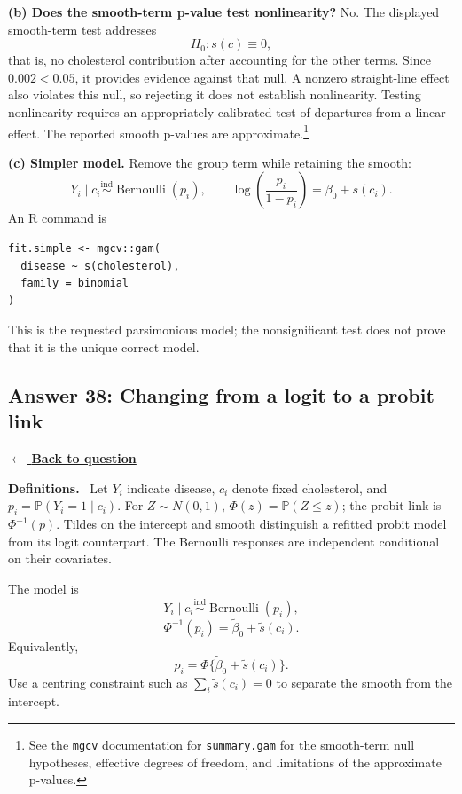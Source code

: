 \documentclass[11pt,a4paper]{article}
\newcommand{\given}{\mathrel{|}}
\newcommand{\answernav}[1]{%
  \label{answer:#1}%
  \noindent\hyperref[question:#1]{$\leftarrow$ \textbf{Back to question}}%
  \par\smallskip}
\newcommand{\studyheading}[1]{%
  \par\medskip\noindent\textcolor{statblue}{\textbf{#1.}}\ }
\begin{document}
\textbf{(b) Does the smooth-term p-value test nonlinearity?}
No. The displayed smooth-term test addresses
\[
\boxed{H_0:s(c)\equiv0,}
\]
that is, no cholesterol contribution after accounting for the other
terms. Since $0.002<0.05$, it provides evidence against that null.
A nonzero straight-line effect also violates this null, so rejecting it
does not establish nonlinearity. Testing nonlinearity requires an
appropriately calibrated test of departures from a linear effect.
The reported smooth p-values are approximate.\footnote{See the
\href{https://stat.ethz.ch/R-manual/R-devel/library/mgcv/html/summary.gam.html}
{\texttt{mgcv} documentation for \texttt{summary.gam}} for the smooth-term
null hypotheses, effective degrees of freedom, and limitations of the
approximate p-values.}

\textbf{(c) Simpler model.}
Remove the group term while retaining the smooth:
\[
Y_i\given c_i\overset{\mathrm{ind}}{\sim}\operatorname{Bernoulli}(p_i),
\qquad
\log\left(\frac{p_i}{1-p_i}\right)=\beta_0+s(c_i).
\]
An R command is
\begin{samepage}
\begin{verbatim}
fit.simple <- mgcv::gam(
  disease ~ s(cholesterol),
  family = binomial
)
\end{verbatim}
\end{samepage}
This is the requested parsimonious model; the nonsignificant test does not
prove that it is the unique correct model.

\clearpage

\subsection{Answer 38: Changing from a logit to a probit link}
\answernav{38}

\studyheading{Definitions}
Let $Y_i$ indicate disease, $c_i$ denote fixed cholesterol, and $p_i=\mathbb P(Y_i=1\given c_i)$.
For $Z\sim N(0,1)$, $\Phi(z)=\mathbb P(Z\le z)$; the probit link is $\Phi^{-1}(p)$.
Tildes on the intercept and smooth distinguish a refitted probit model from its logit counterpart.
The Bernoulli responses are independent conditional on their covariates.

The model is
\[
Y_i\given c_i\overset{\mathrm{ind}}{\sim}\operatorname{Bernoulli}(p_i),
\]
\[
\boxed{\Phi^{-1}(p_i)=\widetilde\beta_0+\widetilde s(c_i).}
\]
Equivalently,
\[
\boxed{p_i=\Phi\{\widetilde\beta_0+\widetilde s(c_i)\}.}
\]
Use a centring constraint such as $\sum_i\widetilde s(c_i)=0$ to separate the smooth from the intercept.
\end{document}
